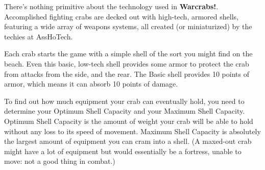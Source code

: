 \documentclass[a4paper,10pt]{article}
\newcommand{\warcrabs}{\textbf{Warcrabs!}}
\begin{document}
There's nothing primitive about the technology used in \warcrabs. Accomplished fighting crabs are decked out with high-tech, armored shells, featuring a wide array of weapons systems, all created (or miniaturized) by the techies at AssHoTech.

Each crab starts the game with a simple shell of the sort you might find on the beach. Even this basic, low-tech shell provides some armor to protect the crab from attacks from the side, and the rear. The Basic shell provides 10 points of armor, which means it can absorb 10 points of damage.

To find out how much equipment your crab can eventually hold, you need to determine your Optimum Shell Capacity and your Maximum Shell Capacity. Optimum Shell Capacity is the amount of weight your crab will be able to hold without any loss to its speed of movement. Maximum Shell Capacity is absolutely the largest amount of equipment you can cram into a shell. (A maxed-out crab might have a lot of equipment but would essentially be a fortress, unable to move: not a good thing in combat.)
\end{document}
